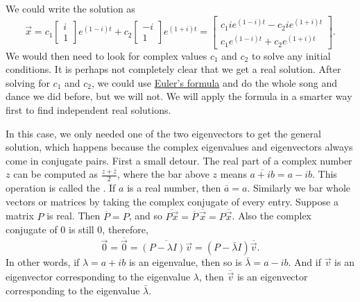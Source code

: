 We could write the solution as
\begin{equation*}
\vec{x} =
c_1 \begin{bmatrix} i \\ 1 \end{bmatrix} e^{(1-i)t} +
c_2 \begin{bmatrix} -i \\ 1 \end{bmatrix} e^{(1+i)t}
=
\begin{bmatrix}
c_1 i e^{(1-i)t} - c_2 i e^{(1+i)t} \\
c_1 e^{(1-i)t} + c_2 e^{(1+i)t}
\end{bmatrix} .
\end{equation*}
We would then need to look for complex values $c_1$ and $c_2$ to solve
any initial conditions.  It is perhaps not completely clear
that we get a real solution.  After solving for $c_1$ and $c_2$,
we could use
\hyperref[eulersformula]{Euler's formula} and do the
whole song and dance we did before, but we will not.   We will apply
the formula in a smarter way first to find independent real solutions.

\medskip

In this case, we only needed one of the two eigenvectors to get the general solution, which happens because the complex eigenvalues and eigenvectors always come in conjugate pairs. First a small detour.  The real part of
a complex number $z$ can be computed as $\frac{z + \bar{z}}{2}$, where
the bar above $z$ means $\overline{a+ib} = a -ib$.  This operation is called the
\emph{}.
If $a$ is a real number, then $\bar{a} = a$.
Similarly
we bar whole vectors or matrices by taking the complex conjugate
of every entry.  Suppose a matrix $P$ is real.  Then
$\overline{P} = P$, and so $\overline{P\vec{x}} = \overline{P} \,
\overline{\vec{x}} = P \overline{\vec{x}}$.
Also the complex conjugate of 0 is still 0,
therefore,
\begin{equation*}
\vec{0} = \overline{\vec{0}} = 
\overline{(P-\lambda I)\vec{v}}
=
(P-\bar{\lambda} I)\overline{\vec{v}} .
\end{equation*}
In other words, if $\lambda = a+ib$ is an eigenvalue, then so is $\bar{\lambda} = a-ib$.
And if $\vec{v}$ is an eigenvector corresponding to the eigenvalue
$\lambda$, then $\overline{\vec{v}}$ is an eigenvector corresponding
to the eigenvalue $\bar{\lambda}$.  

